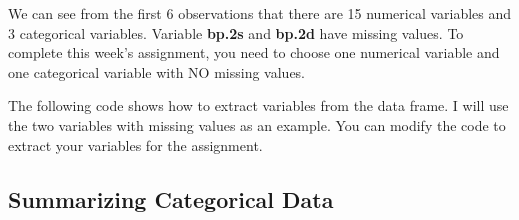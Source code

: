 \documentclass[
]{book}
\newenvironment{Shaded}{\begin{snugshade}}{\end{snugshade}}
\newcommand{\FloatTok}[1]{\textcolor[rgb]{0.00,0.00,0.81}{#1}}
\newcommand{\NormalTok}[1]{#1}
\newcommand{\OtherTok}[1]{\textcolor[rgb]{0.56,0.35,0.01}{#1}}
\newcommand{\SpecialCharTok}[1]{\textcolor[rgb]{0.81,0.36,0.00}{\textbf{#1}}}
\begin{document}
We can see from the first 6 observations that there are 15 numerical variables and 3 categorical variables. Variable \textbf{bp.2s} and \textbf{bp.2d} have missing values. To complete this week's assignment, you need to choose one numerical variable and one categorical variable with NO missing values.

The following code shows how to extract variables from the data frame. I will use the two variables with missing values as an example. You can modify the code to extract your variables for the assignment.

\begin{Shaded}
\end{Shaded}

\hypertarget{summarizing-categorical-data}{%
\subsection{Summarizing Categorical Data}\label{summarizing-categorical-data}}
\end{document}
